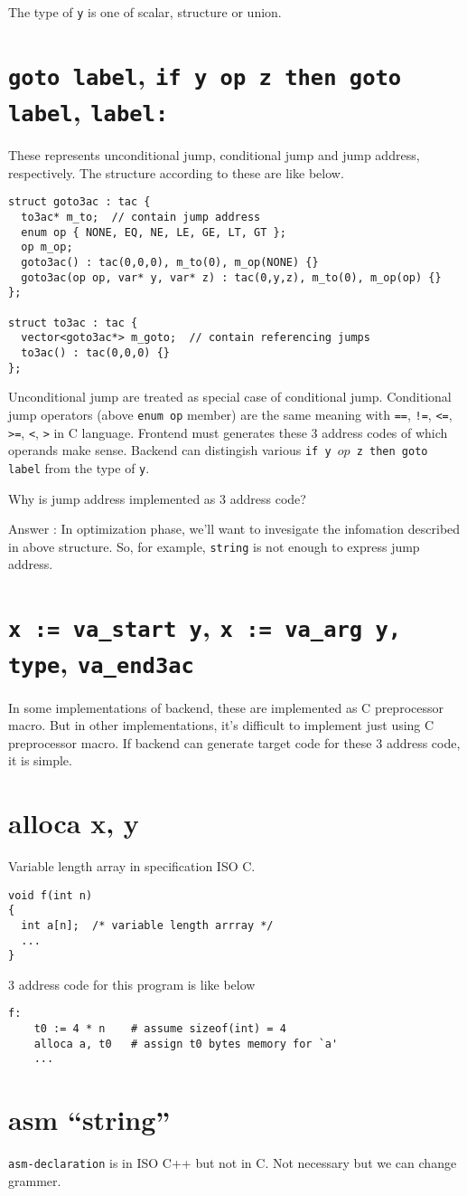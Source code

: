 The type of {\tt{y}} is one of scalar, structure or union.

\section{{\tt{goto label}}, {\tt{if y op z then goto label}}, {\tt{label:}}}
\label{_3ac_e002}
These represents unconditional jump, conditional jump and
jump address,  respectively. The structure according to these are
like below.
\begin{verbatim}
struct goto3ac : tac {
  to3ac* m_to;  // contain jump address
  enum op { NONE, EQ, NE, LE, GE, LT, GT };
  op m_op;
  goto3ac() : tac(0,0,0), m_to(0), m_op(NONE) {}
  goto3ac(op op, var* y, var* z) : tac(0,y,z), m_to(0), m_op(op) {}
};

struct to3ac : tac {
  vector<goto3ac*> m_goto;  // contain referencing jumps
  to3ac() : tac(0,0,0) {}
};
\end{verbatim}
Unconditional jump are treated as special case of conditional jump.
Conditional jump operators (above {\tt{enum op}} member) 
are the same meaning with 
{\tt{==}}, {\tt{!=}}, {\tt{<=}}, {\tt{>=}}, {\tt{<}}, {\tt{>}}
in C language.
Frontend must generates these 3 address codes of which operands make sense.
Backend can distingish various {\tt{if y $op$ z then goto label}}
from the type of {\tt{y}}.

\begin{QandA}
Why is jump address implemented as 3 address code?

Answer : In optimization phase, we'll want to invesigate
the infomation described in above structure. So, for example,
{\tt{string}} is not enough to express jump address.
\end{QandA}

\section{ {\tt{x := va\_start y}}, {\tt{x := va\_arg y, type}}, {\tt{va\_end3ac}}}

In some implementations of backend,
these are implemented as C preprocessor macro.
But in other implementations, it's difficult to implement just using
C preprocessor macro. If backend can generate target code
for these 3 address code, it is simple.

\section{alloca x, y}
\label{_3ac_e003}
Variable length array in specification ISO C. 
\begin{verbatim}
void f(int n)
{
  int a[n];  /* variable length arrray */
  ...
}
\end{verbatim}
3 address code for this program is like below
\begin{verbatim}
f:
    t0 := 4 * n    # assume sizeof(int) = 4
    alloca a, t0   # assign t0 bytes memory for `a'
    ...
\end{verbatim}

\section{asm ``string''}

{\tt{asm-declaration}} is in ISO C++ but not in C.
Not necessary but we can change grammer.


